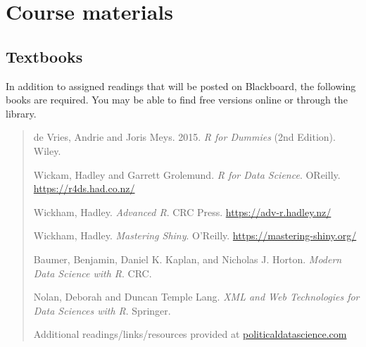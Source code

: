 \documentclass[11pt]{article}
\begin{document}
\section*{Course materials}

\subsection*{Textbooks}


In addition to assigned readings that will be posted on Blackboard,
the following books are required.  You may be able to find free
versions online or through the library. \singlespacing

\begin{quote}
\noindent de Vries, Andrie and Joris Meys. 2015.  \textit{R for
  Dummies} (2nd Edition). Wiley. 
\vspace{.2cm}

\noindent Wickam, Hadley and Garrett Grolemund. \textit{R for Data Science}. OReilly.  
\url{https://r4ds.had.co.nz/}

\vspace{.2cm}

\noindent Wickham, Hadley.  \textit{Advanced R}. CRC Press. \url{https://adv-r.hadley.nz/}
\vspace{.2cm}

\noindent Wickham, Hadley.  \textit{Mastering Shiny}. O'Reilly. \url{https://mastering-shiny.org/}
\vspace{.2cm}

\noindent Baumer, Benjamin, Daniel K. Kaplan, and Nicholas J. Horton. \textit{Modern Data Science with R}. CRC. 

\noindent Nolan, Deborah and Duncan Temple Lang.  \textit{XML and Web Technologies for Data Sciences with R}.  Springer.


Additional readings/links/resources provided at \url{politicaldatascience.com}
\vspace{.2cm}





\end{quote}







\end{document}

